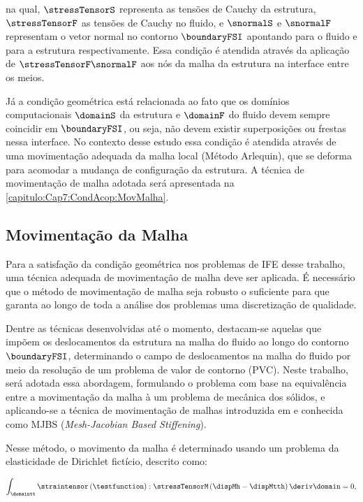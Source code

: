 \noindent na qual, $\stressTensorS$ representa as tensões de Cauchy da estrutura, $\stressTensorF$ as tensões de Cauchy no fluido, e $\snormalS$ e $\snormalF$ representam o vetor normal no contorno $\boundaryFSI$ apontando para o fluido e para a estrutura respectivamente. Essa condição é atendida através da aplicação de $\stressTensorF \snormalF$ aos nós da malha da estrutura na interface entre os meios.

Já a condição geométrica está relacionada ao fato que os domínios computacionais $\domainS$ da estrutura e $\domainF$ do fluido devem sempre coincidir em $\boundaryFSI$, ou seja, não devem existir superposições ou frestas nessa interface. No contexto desse estudo essa condição é atendida através de uma movimentação adequada da malha local (Método Arlequin), que se deforma para acomodar a mudança de configuração da estrutura. A técnica de movimentação de malha adotada será apresentada na \autoref{capitulo:Cap7:CondAcop:MovMalha}.

\subsection{Movimentação da Malha} \label{capitulo:Cap7:CondAcop:MovMalha}

Para a satisfação da condição geométrica nos problemas de IFE desse trabalho, uma técnica adequada de movimentação de malha deve ser aplicada. É necessário que o método de movimentação de malha seja robusto o suficiente para que garanta ao longo de toda a análise dos problemas uma discretização de qualidade.

Dentre as técnicas desenvolvidas até o momento, destacam-se aquelas que impõem os deslocamentos da estrutura na malha do fluido ao longo do contorno $\boundaryFSI$, determinando o campo de deslocamentos na malha do fluido por meio da resolução de um problema de valor de contorno (PVC). Neste trabalho, será adotada essa abordagem, formulando o problema com base na equivalência entre a movimentação da malha à um problema de mecânica dos sólidos, e aplicando-se a técnica de movimentação de malhas introduzida em  e  conhecida como MJBS (\textit{Mesh-Jacobian Based Stiffening}).

Nesse método, o movimento da malha é determinado usando um problema da elasticidade de Dirichlet fictício, descrito como:

\begin{align}
	\int_{\domaintt} \straintensor \left(\testfunction\right) : \stressTensorM \left(\dispMh - \dispMtth \right) \deriv \domain = 0,
	\label{eq:elasticity}
\end{align}

